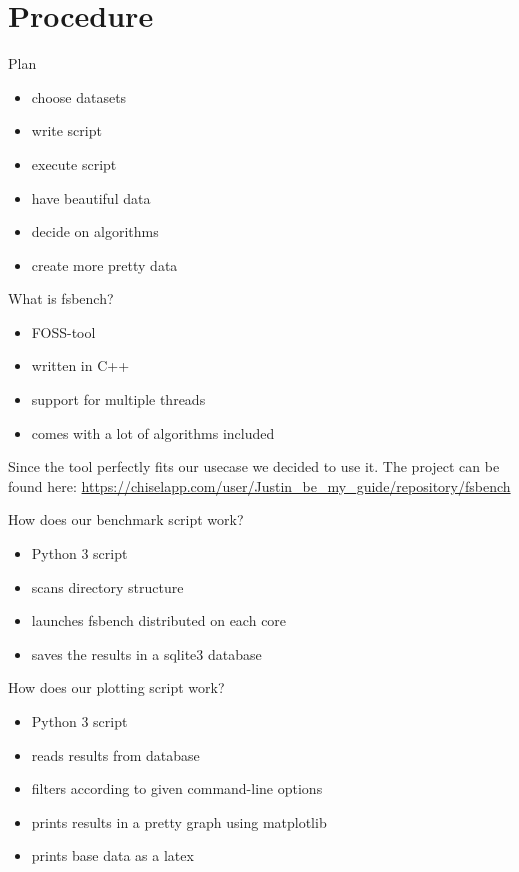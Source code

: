 \documentclass[10pt, compress]{beamer}
\begin{document}
\section{Procedure}
\begin{frame}{Plan}
    \begin{itemize}
        \item choose datasets
        \item write script
        \item execute script
        \item have beautiful data
        \item decide on algorithms
        \item create more pretty data
    \end{itemize}
\end{frame}
\begin{frame}{What is fsbench?}
    \begin{itemize}
        \item FOSS-tool
        \item written in C++
        \item support for multiple threads
        \item comes with a lot of algorithms included
    \end{itemize}
    \vspace{1em}
    Since the tool perfectly fits our usecase we decided to use it.
    The project can be found here:    
    \url{https://chiselapp.com/user/Justin_be_my_guide/repository/fsbench}
\end{frame}
\begin{frame}{How does our benchmark script work?}
    \begin{itemize}
        \item Python 3 script
        \item scans directory structure
        \item launches fsbench distributed on each core
        \item saves the results in a sqlite3 database
    \end{itemize}    
\end{frame}

\begin{frame}{How does our plotting script work?}
    \begin{itemize}
        \item Python 3 script
        \item reads results from database
        \item filters according to given command-line options
        \item prints results in a pretty graph using matplotlib
        \item prints base data as a latex 
    \end{itemize}    
\end{frame}
\end{document}
